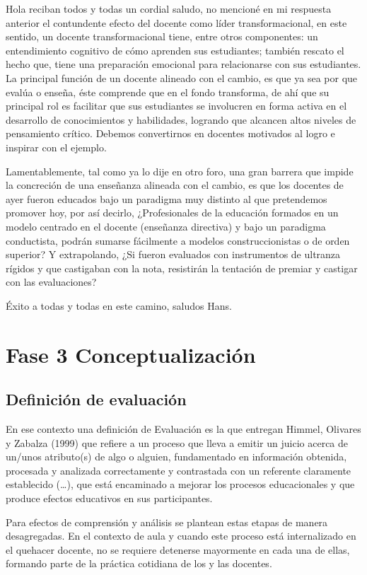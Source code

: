 \documentclass[12pt,letterpaper,article,x11names]{memoir}
\begin{document}
Hola reciban todos y todas un cordial saludo, no mencioné en mi respuesta anterior el contundente efecto del docente como líder transformacional, en este sentido, un docente transformacional tiene, entre otros componentes: un entendimiento cognitivo de cómo aprenden sus estudiantes; también rescato el hecho que, tiene una preparación emocional para relacionarse con sus estudiantes. La principal función de un docente alineado con el cambio, es que ya sea por que evalúa o enseña, éste comprende que en el fondo transforma, de ahí que su principal rol es facilitar que sus estudiantes se involucren en forma activa en el desarrollo de conocimientos y habilidades, logrando que alcancen altos niveles de pensamiento crítico. Debemos convertirnos en docentes motivados al logro e inspirar con el ejemplo. 

Lamentablemente, tal como ya lo dije en otro foro, una gran barrera que impide la concreción de una enseñanza alineada con el cambio, es que los docentes de ayer fueron educados bajo un paradigma muy distinto al que pretendemos promover hoy, por así decirlo, ¿Profesionales de la educación formados en un modelo centrado en el docente (enseñanza directiva) y bajo un paradigma conductista, podrán sumarse fácilmente a modelos construccionistas o de orden superior? Y extrapolando, ¿Si fueron evaluados con instrumentos de ultranza rígidos y que castigaban con la nota, resistirán la tentación de premiar y castigar con las evaluaciones?

Éxito a todas y todas en este camino, saludos Hans.
\chapter{Fase 3 Conceptualización}
\label{sec:org68cccfb}
\section{Definición de evaluación}
\label{sec:org4d30c99}
En ese contexto una definición de Evaluación es la que entregan Himmel, Olivares y Zabalza (1999) que refiere a un \guillemotleft{}proceso que lleva a emitir un juicio acerca de un/unos atributo(s) de algo o alguien, fundamentado en información obtenida, procesada y analizada correctamente y contrastada con un referente claramente establecido (…), que está encaminado a mejorar los procesos educacionales y que produce efectos educativos en sus participantes\guillemotright{}.

Para efectos de comprensión y análisis se plantean estas etapas de manera desagregadas. En el contexto de aula y cuando este proceso está internalizado en el quehacer docente, no se requiere detenerse mayormente en cada una de ellas, formando parte de la práctica cotidiana de los y las docentes.
\end{document}
